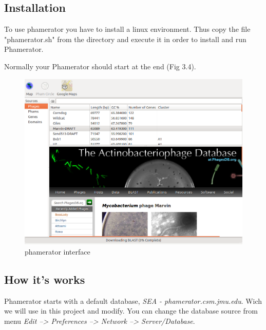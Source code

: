 \documentclass[a4paper,11pt]{report}
\begin{document}
\subsection{Installation}
To use phamerator you have to install a linux environment. Thus copy the file "phamerator.sh" from the directory and execute it in order to install and run Phamerator.

Normally your Phamerator should start at the end (Fig 3.4).

\begin{figure}[H] 
	\begin{center}
		\includegraphics[scale=0.3]{img/phamerator_1}
		\caption{phamerator interface}
	\end{center}
\end{figure}

\subsection{How it's works}

Phamerator starts with a default database, \textit{SEA - phamerator.csm.jmu.edu}. Wich we will use in this project and modify. You can change the database source from menu \textit{Edit --> Preferences --> Network --> Server/Database}.
\end{document}

